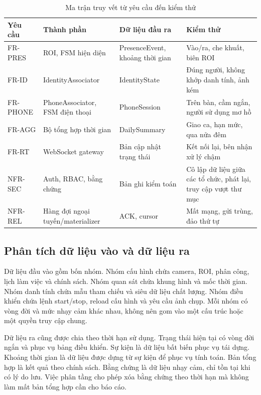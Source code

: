 \begin{table}[H]
\centering
\caption{Ma trận truy vết từ yêu cầu đến kiểm thử}
\label{tab:requirements-traceability}
\begin{tabularx}{\textwidth}{p{2.1cm}p{3.7cm}X X}
\toprule
\textbf{Yêu cầu} & \textbf{Thành phần} & \textbf{Dữ liệu đầu ra} & \textbf{Kiểm thử}\\
\midrule
FR-PRES & ROI, FSM hiện diện & PresenceEvent, khoảng thời gian & Vào/ra, che khuất, biên ROI\\
FR-ID & IdentityAssociator & IdentityState & Đúng người, không khớp danh tính, ảnh kém\\
FR-PHONE & PhoneAssociator, FSM điện thoại & PhoneSession & Trên bàn, cầm ngắn, người sử dụng mơ hồ\\
FR-AGG & Bộ tổng hợp thời gian & DailySummary & Giao ca, hạn mức, qua nửa đêm\\
FR-RT & WebSocket gateway & Bản cập nhật trạng thái & Kết nối lại, bên nhận xử lý chậm\\
NFR-SEC & Auth, RBAC, bằng chứng & Bản ghi kiểm toán & Cô lập dữ liệu giữa các tổ chức, phát lại, truy cập vượt thư mục\\
NFR-REL & Hàng đợi ngoại tuyến/materializer & ACK, cursor & Mất mạng, gửi trùng, đảo thứ tự\\
\bottomrule
\end{tabularx}
\end{table}

\subsection{Phân tích dữ liệu vào và dữ liệu ra}
Dữ liệu đầu vào gồm bốn nhóm. Nhóm cấu hình chứa camera, ROI, phân công, lịch làm việc và chính sách. Nhóm quan sát chứa khung hình và mốc thời gian. Nhóm danh tính chứa mẫu tham chiếu và siêu dữ liệu chất lượng. Nhóm điều khiển chứa lệnh start/stop, reload cấu hình và yêu cầu ảnh chụp. Mỗi nhóm có vòng đời và mức nhạy cảm khác nhau, không nên gom vào một cấu trúc hoặc một quyền truy cập chung.

Dữ liệu ra cũng được chia theo thời hạn sử dụng. Trạng thái hiện tại có vòng đời ngắn và phục vụ bảng điều khiển. Sự kiện là dữ liệu bất biến phục vụ tái dựng. Khoảng thời gian là dữ liệu được dựng từ sự kiện để phục vụ tính toán. Bản tổng hợp là kết quả theo chính sách. Bằng chứng là dữ liệu nhạy cảm, chỉ tồn tại khi có lý do lưu. Việc phân tầng cho phép xóa bằng chứng theo thời hạn mà không làm mất bản tổng hợp cần cho báo cáo.

